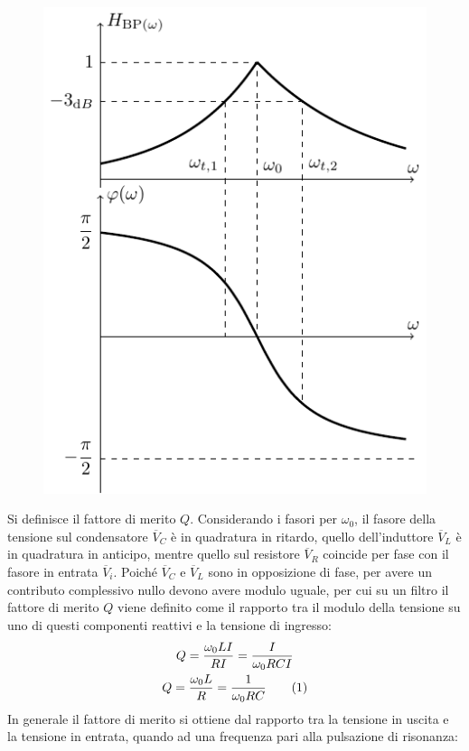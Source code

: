 \documentclass{article}
\newcommand{\tageq}{\tag{\stepcounter{equation}\theequation}}
\numberwithin{equation}{subsection}
\begin{document}
\begin{figure}[H]%
    \centering
    \includegraphics{passa-banda.pdf}%
\end{figure}
Si definisce il fattore di merito $Q$. 
Considerando i fasori per $\omega_0$, il fasore della tensione sul condensatore $\overline{V}_C$ è in quadratura in ritardo, quello dell'induttore $\overline{V}_L$ è in 
quadratura in anticipo, mentre quello sul resistore $\overline{V}_R$ coincide per fase con il fasore in entrata $\overline{V}_i$. 
Poiché $\overline{V}_C$ e $\overline{V}_L$ sono in opposizione di fase, per avere un contributo complessivo nullo devono avere modulo uguale, per cui su un filtro il 
fattore di merito $Q$ viene definito come il rapporto tra il modulo della tensione su uno di questi componenti reattivi e la tensione di ingresso:
\begin{gather*}
    Q=\displaystyle\frac{\omega_0LI}{RI}=\frac{I}{\omega_0RCI}\\
    Q=\displaystyle\frac{\omega_0L}{R}=\frac{1}{\omega_0RC}\tageq
\end{gather*}
In generale il fattore di merito si ottiene dal rapporto tra la tensione in uscita e la tensione in entrata, quando ad una frequenza pari alla pulsazione di risonanza:
\end{document}
